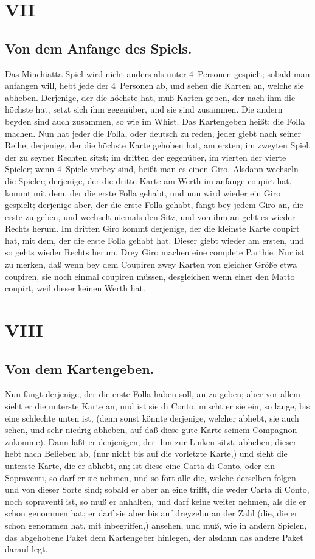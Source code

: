 \documentclass[11pt,a6paper,twoside]{article}
\begin{document}
\section{VII}
\subsection{Von dem Anfange des Spiels.}

Das Minchiatta-Spiel wird nicht anders als unter 4~Personen gespielt; sobald man anfangen will, hebt jede der 4~Personen ab, und sehen die Karten an, welche sie abheben. Derjenige, der die höchste hat, muß Karten geben, der nach ihm die höchste hat, setzt sich ihm gegenüber, und sie sind zusammen. Die andern beyden sind auch zusammen, so wie im Whist. Das Kartengeben heißt: die Folla machen. Nun hat jeder die Folla, oder deutsch zu reden, jeder giebt nach seiner Reihe; derjenige, der die höchste Karte gehoben hat, am ersten; im zweyten Spiel, der zu seyner Rechten sitzt; im dritten der gegenüber, im vierten der vierte Spieler; wenn 4~Spiele vorbey sind, heißt man es einen Giro. Alsdann wechseln die Spieler; derjenige, der die dritte Karte am Werth im anfange coupirt hat, kommt mit dem, der die erste Folla gehabt, und nun wird wieder ein Giro gespielt; derjenige aber, der die erste Folla gehabt, fängt bey jedem Giro an, die erste zu geben, und wechselt niemals den Sitz, und von ihm an geht es wieder Rechts herum. Im dritten Giro kommt derjenige, der die kleinste Karte coupirt hat, mit dem, der die erste Folla gehabt hat. Dieser giebt wieder am ersten, und so gehts wieder Rechts herum. Drey Giro machen eine complete Parthie. Nur ist zu merken, daß wenn bey dem Coupiren zwey Karten von gleicher Größe etwa coupiren, sie noch einmal coupiren müssen, desgleichen wenn einer den Matto coupirt, weil dieser keinen Werth hat.

\section{VIII}
\subsection{Von dem Kartengeben.}

Nun fängt derjenige, der die erste Folla haben soll, an zu geben; aber vor allem sieht er die unterste Karte an, und ist sie di Conto, mischt er sie ein, so lange, bis eine schlechte unten ist, (denn sonst könnte derjenige, welcher abhebt, sie auch sehen, und sehr niedrig abheben, auf daß diese gute Karte seinem Compagnon zukomme). Dann läßt er denjenigen, der ihm zur Linken sitzt, abheben; dieser hebt nach Belieben ab, (nur nicht bis auf die vorletzte Karte,) und sieht die unterste Karte, die er abhebt, an; ist diese eine Carta di Conto, oder ein Sopraventi, so darf er sie nehmen, und so fort alle die, welche derselben folgen und von dieser Sorte sind; sobald er aber an eine trifft, die weder Carta di Conto, noch sopraventi ist, so muß er anhalten, und darf keine weiter nehmen, als die er schon genommen hat; er darf sie aber bis auf dreyzehn an der Zahl (die, die er schon genommen hat, mit inbegriffen,) ansehen, und muß, wie in andern Spielen, das abgehobene Paket dem Kartengeber hinlegen, der alsdann das andere Paket darauf legt.
\end{document}
